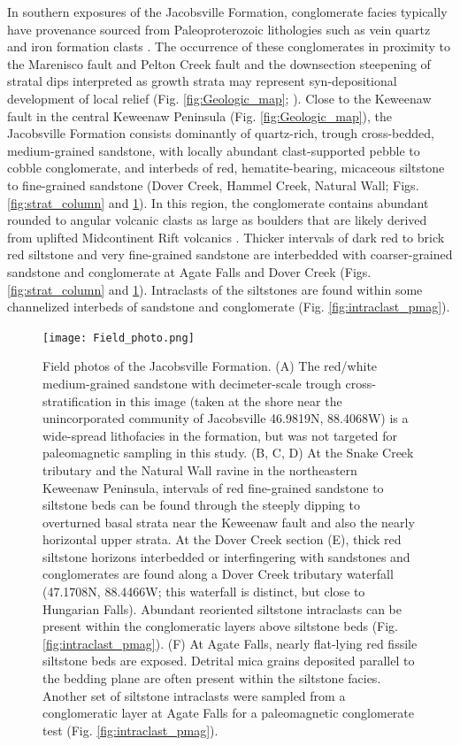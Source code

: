 \documentclass[draft]{agujournal2019}
\begin{document}
In southern exposures of the Jacobsville Formation, conglomerate facies typically have provenance sourced from Paleoproterozoic lithologies such as vein quartz and iron formation clasts \cite{Hamblin1958a, Kalliokoski1982a}. The occurrence of these conglomerates in proximity to the Marenisco fault and Pelton Creek fault and the downsection steepening of stratal dips interpreted as growth strata may represent syn-depositional development of local relief (Fig. \ref{fig:Geologic_map}; ). Close to the Keweenaw fault in the central Keweenaw Peninsula (Fig. \ref{fig:Geologic_map}), the Jacobsville Formation consists dominantly of quartz-rich, trough cross-bedded, medium-grained sandstone, with locally abundant clast-supported pebble to cobble conglomerate, and interbeds of red, hematite-bearing, micaceous siltstone to fine-grained sandstone (Dover Creek, Hammel Creek, Natural Wall; Figs. \ref{fig:strat_column} and \ref{fig:Field_photo}). In this region, the conglomerate contains abundant rounded to angular volcanic clasts as large as boulders that are likely derived from uplifted Midcontinent Rift volcanics \cite{Irving1885a, Brojanigo1984a}. Thicker intervals of dark red to brick red siltstone and very fine-grained sandstone are interbedded with coarser-grained sandstone and conglomerate at Agate Falls and Dover Creek (Figs. \ref{fig:strat_column} and \ref{fig:Field_photo}). Intraclasts of the siltstones are found within some channelized interbeds of sandstone and conglomerate (Fig. \ref{fig:intraclast_pmag}). 

\begin{figure}[h!]
\centering
\texttt{[image: Field\_photo.png]}
\caption{\scriptsize Field photos of the Jacobsville Formation. (A) The red/white medium-grained sandstone with decimeter-scale trough cross-stratification in this image (taken at the shore near the unincorporated community of Jacobsville 46.9819\textdegree N, 88.4068\textdegree W) is a wide-spread lithofacies in the formation, but was not targeted for paleomagnetic sampling in this study. (B, C, D) At the Snake Creek tributary and the Natural Wall ravine in the northeastern Keweenaw Peninsula, intervals of red fine-grained sandstone to siltstone beds can be found through the steeply dipping to overturned basal strata near the Keweenaw fault and also the nearly horizontal upper strata. At the Dover Creek section (E), thick red siltstone horizons interbedded or interfingering with sandstones and conglomerates are found along a Dover Creek tributary waterfall (47.1708\textdegree N, 88.4466\textdegree W; this waterfall is distinct, but close to Hungarian Falls). Abundant reoriented siltstone intraclasts can be present within the conglomeratic layers above siltstone beds (Fig. \ref{fig:intraclast_pmag}). (F) At Agate Falls, nearly flat-lying red fissile siltstone beds are exposed. Detrital mica grains deposited parallel to the bedding plane are often present within the siltstone facies. Another set of siltstone intraclasts were sampled from a conglomeratic layer at Agate Falls for a paleomagnetic conglomerate test (Fig. \ref{fig:intraclast_pmag}).}
\label{fig:Field_photo}
\end{figure}
\end{document}
